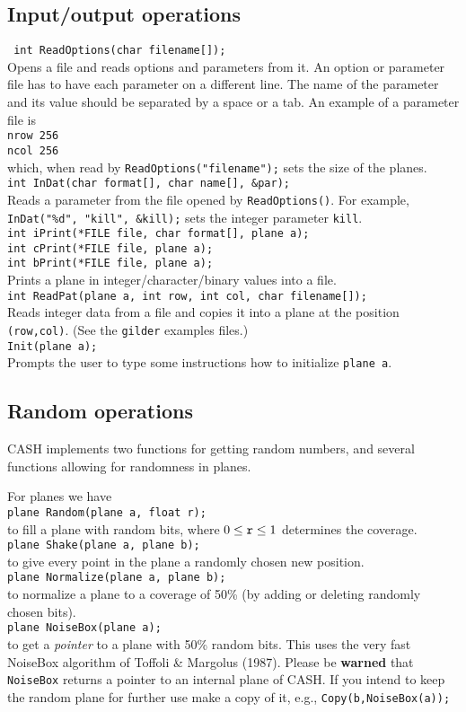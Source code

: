 \documentclass[12pt]{article}
\newcommand{\mtt}[1]{\texttt{\\#1\\}}
\begin{document}
\subsection{Input/output operations}
\texttt{ int ReadOptions(char filename[]);\\}
Opens a file and reads options and parameters from it.
An option or parameter file has to have each parameter on a different line. 
The name of the parameter and its value should be separated by
a space or a tab. An example of a parameter file is
\mtt{nrow 256\\ncol 256}
which, when read by {\tt ReadOptions("filename");} sets the size of the
planes.
\mtt{ int InDat(char format[], char name[], \&par);}
Reads a parameter from the file opened by {\tt ReadOptions()}.
For example, {\tt InDat("\%d", "kill", \&kill);} sets the integer parameter
{\tt kill}.
\mtt{ 
int iPrint(*FILE file, char format[], plane a);\\
int cPrint(*FILE file, plane a);\\
int bPrint(*FILE file, plane a);
}
Prints a plane in integer/character/binary values into a file.
\mtt{ int ReadPat(plane a, int row, int col, char filename[]);}
Reads integer data from a file and copies it into a plane at
the position {\tt (row,col)}. (See the {\tt gilder} examples files.)
\mtt{ Init(plane a);}
Prompts the user to type some instructions how to initialize {\tt plane a}.

\subsection{Random operations}
CASH implements two functions for getting random numbers,
and several functions allowing for randomness in planes.

For planes we have
\mtt{ plane Random(plane a, float r);}
to fill a plane with random bits, where $0\le {\tt r} \le 1$ determines
the coverage.
\mtt{ plane Shake(plane a, plane b);}
to give every point in the plane a randomly chosen new position.
\mtt{ plane Normalize(plane a, plane b);}
to normalize a plane to a coverage of 50\% (by adding or
deleting randomly chosen bits).
\mtt{ plane NoiseBox(plane a);}
to get a {\sl pointer} to a plane with 50\% random bits.
This uses the very fast NoiseBox algorithm of Toffoli \& Margolus
(1987).
Please be {\bf warned} that {\tt NoiseBox} returns a pointer
to an internal plane of CASH. If you intend to keep the random
plane for further use make a copy of it,
e.g., {\tt Copy(b,NoiseBox(a));}
\end{document}
